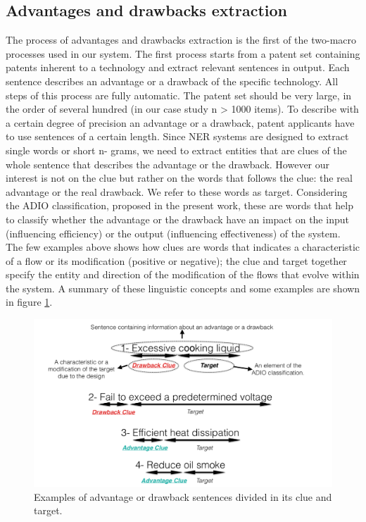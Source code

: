 \documentclass[]{book}
\begin{document}
\subsection{Advantages and drawbacks
extraction}\label{advantages-and-drawbacks-extraction}

The process of advantages and drawbacks extraction is the first of the
two-macro processes used in our system. The first process starts from a
patent set containing patents inherent to a technology and extract
relevant sentences in output. Each sentence describes an advantage or a
drawback of the specific technology. All steps of this process are fully
automatic. The patent set should be very large, in the order of several
hundred (in our case study n \textgreater{} 1000 items). To describe
with a certain degree of precision an advantage or a drawback, patent
applicants have to use sentences of a certain length. Since NER systems
are designed to extract single words or short n- grams, we need to
extract entities that are clues of the whole sentence that describes the
advantage or the drawback. However our interest is not on the clue but
rather on the words that follows the clue: the real advantage or the
real drawback. We refer to these words as target. Considering the ADIO
classification, proposed in the present work, these are words that help
to classify whether the advantage or the drawback have an impact on the
input (influencing efficiency) or the output (influencing effectiveness)
of the system. The few examples above shows how clues are words that
indicates a characteristic of a flow or its modification (positive or
negative); the clue and target together specify the entity and direction
of the modification of the flows that evolve within the system. A
summary of these linguistic concepts and some examples are shown in
figure \ref{fig:audioexamplesent}.

\begin{figure}

{\centering \includegraphics[width=0.8\linewidth]{_bookdown_files/figures/audioexamplesent} 

}

\caption{Examples of advantage or drawback sentences divided in its clue and target.}\label{fig:audioexamplesent}
\end{figure}
\end{document}
